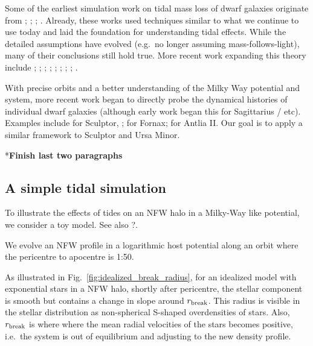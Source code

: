 Some of the earliest simulation work on tidal mass loss of dwarf
galaxies originate from \citet{oh+lin+aarseth1995};
\citet{piatek+pryor1995}; \citet{moore+davis1994};
\citet{johnston+spergel+hernquist1995}. Already, these works used
techniques similar to what we continue to use today and laid the
foundation for understanding tidal effects. While the detailed
assumptions have evolved (e.g.~no longer assuming mass-follows-light),
many of their conclusions still hold true. More recent work expanding
this theory include \citet{read+2006}; \citet{bullock+johnston2005};
\citet{PNM2008}; \citet{penarrubia+2009}; \citet{klimentowski+2009};
\citet{errani+2023a}; \citet{fattahi+2018}; \citet{stucker+2023};
\citet{wang+2017}.

With precise orbits and a better understanding of the Milky Way
potential and system, more recent work began to directly probe the
dynamical histories of individual dwarf galaxies (although early work
began this for Sagittarius / etc). Examples include \citet{iorio+2019}
for Sculptor, \citet{borukhovetskaya+2022}; \citet{dicintio+2024} for
Fornax; \citet{borukhovetskaya+2022a} for Antlia II. Our goal is to
apply a similar framework to Sculptor and Ursa Minor.

*\textbf{Finish last two paragraphs}

\subsection{A simple tidal simulation}\label{a-simple-tidal-simulation}

To illustrate the effects of tides on an NFW halo in a Milky-Way like
potential, we consider a toy model. See also \citet{PNM2008}?.

We evolve an NFW profile in a logarithmic host potential along an orbit
where the pericentre to apocentre is 1:50.

As illustrated in Fig.~\ref{fig:idealized_break_radius}, for an
idealized model with exponential stars in a NFW halo, shortly after
pericentre, the stellar component is smooth but contains a change in
slope around \(r_{\rm break}\). This radius is visible in the stellar
distribution as non-spherical S-shaped overdensities of stars. Also,
\(r_{\rm break}\) is where where the mean radial velocities of the stars
becomes positive, i.e.~the system is out of equilibrium and adjusting to
the new density profile.

